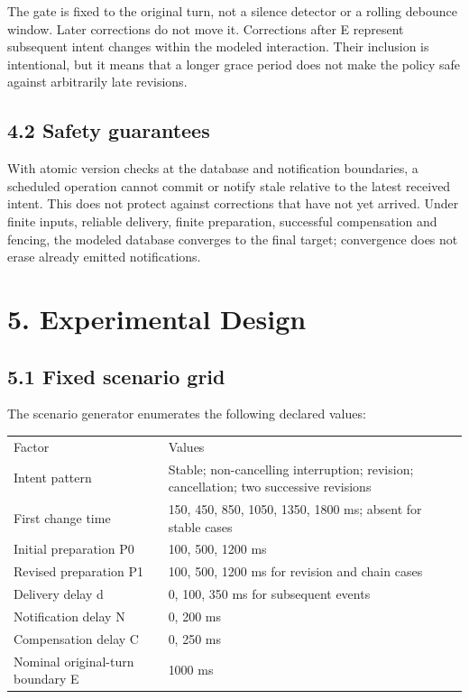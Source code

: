 \documentclass[10pt]{article}
\begin{document}
The gate is fixed to the original turn, not a silence detector or a rolling debounce window. Later corrections do not move it. Corrections after E represent subsequent intent changes within the modeled interaction. Their inclusion is intentional, but it means that a longer grace period does not make the policy safe against arbitrarily late revisions.


\subsection*{4.2 Safety guarantees}

With atomic version checks at the database and notification boundaries, a scheduled operation cannot commit or notify stale relative to the latest received intent. This does not protect against corrections that have not yet arrived. Under finite inputs, reliable delivery, finite preparation, successful compensation and fencing, the modeled database converges to the final target; convergence does not erase already emitted notifications.


\section*{5. Experimental Design}

\subsection*{5.1 Fixed scenario grid}

The scenario generator enumerates the following declared values:


{\scriptsize
\begin{tabularx}{\textwidth}{XX}
\hline
Factor & Values \\
Intent pattern & Stable; non-cancelling interruption; revision; cancellation; two successive revisions \\
First change time & 150, 450, 850, 1050, 1350, 1800 ms; absent for stable cases \\
Initial preparation P0 & 100, 500, 1200 ms \\
Revised preparation P1 & 100, 500, 1200 ms for revision and chain cases \\
Delivery delay d & 0, 100, 350 ms for subsequent events \\
Notification delay N & 0, 200 ms \\
Compensation delay C & 0, 250 ms \\
Nominal original-turn boundary E & 1000 ms \\
\hline
\end{tabularx}
}
\end{document}
